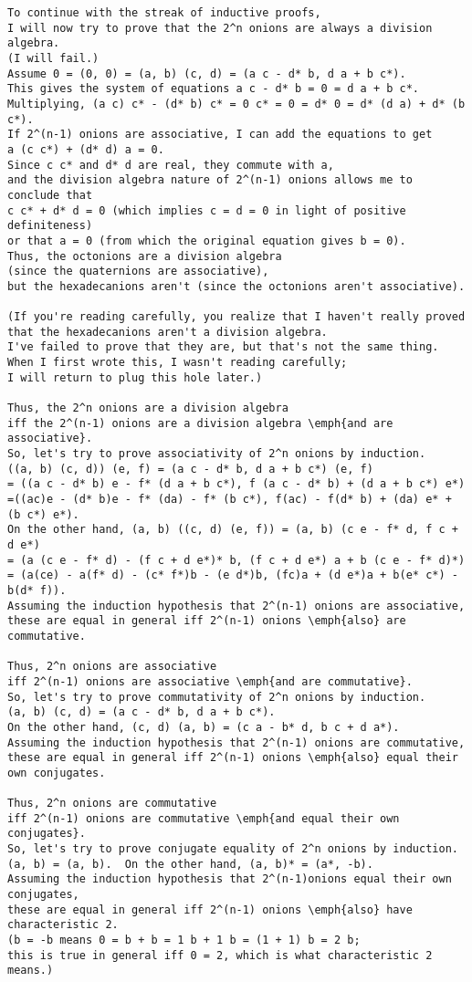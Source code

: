 \begin{verbatim}
To continue with the streak of inductive proofs,
I will now try to prove that the 2^n onions are always a division algebra.
(I will fail.)
Assume 0 = (0, 0) = (a, b) (c, d) = (a c - d* b, d a + b c*).
This gives the system of equations a c - d* b = 0 = d a + b c*.
Multiplying, (a c) c* - (d* b) c* = 0 c* = 0 = d* 0 = d* (d a) + d* (b c*).
If 2^(n-1) onions are associative, I can add the equations to get
a (c c*) + (d* d) a = 0.
Since c c* and d* d are real, they commute with a,
and the division algebra nature of 2^(n-1) onions allows me to conclude that
c c* + d* d = 0 (which implies c = d = 0 in light of positive definiteness)
or that a = 0 (from which the original equation gives b = 0).
Thus, the octonions are a division algebra
(since the quaternions are associative),
but the hexadecanions aren't (since the octonions aren't associative).

(If you're reading carefully, you realize that I haven't really proved
that the hexadecanions aren't a division algebra.
I've failed to prove that they are, but that's not the same thing.
When I first wrote this, I wasn't reading carefully;
I will return to plug this hole later.)

Thus, the 2^n onions are a division algebra
iff the 2^(n-1) onions are a division algebra \emph{and are associative}.
So, let's try to prove associativity of 2^n onions by induction.
((a, b) (c, d)) (e, f) = (a c - d* b, d a + b c*) (e, f)
= ((a c - d* b) e - f* (d a + b c*), f (a c - d* b) + (d a + b c*) e*)
=((ac)e - (d* b)e - f* (da) - f* (b c*), f(ac) - f(d* b) + (da) e* + (b c*) e*).
On the other hand, (a, b) ((c, d) (e, f)) = (a, b) (c e - f* d, f c + d e*)
= (a (c e - f* d) - (f c + d e*)* b, (f c + d e*) a + b (c e - f* d)*)
= (a(ce) - a(f* d) - (c* f*)b - (e d*)b, (fc)a + (d e*)a + b(e* c*) - b(d* f)).
Assuming the induction hypothesis that 2^(n-1) onions are associative,
these are equal in general iff 2^(n-1) onions \emph{also} are commutative.

Thus, 2^n onions are associative
iff 2^(n-1) onions are associative \emph{and are commutative}.
So, let's try to prove commutativity of 2^n onions by induction.
(a, b) (c, d) = (a c - d* b, d a + b c*).
On the other hand, (c, d) (a, b) = (c a - b* d, b c + d a*).
Assuming the induction hypothesis that 2^(n-1) onions are commutative,
these are equal in general iff 2^(n-1) onions \emph{also} equal their own conjugates.

Thus, 2^n onions are commutative
iff 2^(n-1) onions are commutative \emph{and equal their own conjugates}.
So, let's try to prove conjugate equality of 2^n onions by induction.
(a, b) = (a, b).  On the other hand, (a, b)* = (a*, -b).
Assuming the induction hypothesis that 2^(n-1)onions equal their own conjugates,
these are equal in general iff 2^(n-1) onions \emph{also} have characteristic 2.
(b = -b means 0 = b + b = 1 b + 1 b = (1 + 1) b = 2 b;
this is true in general iff 0 = 2, which is what characteristic 2 means.)


\end{verbatim}
